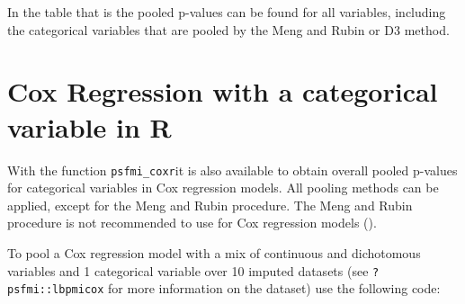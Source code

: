 \documentclass[
]{book}
\newenvironment{Shaded}{\begin{snugshade}}{\end{snugshade}}
\newcommand{\DataTypeTok}[1]{\textcolor[rgb]{0.13,0.29,0.53}{#1}}
\newcommand{\DecValTok}[1]{\textcolor[rgb]{0.00,0.00,0.81}{#1}}
\newcommand{\KeywordTok}[1]{\textcolor[rgb]{0.13,0.29,0.53}{\textbf{#1}}}
\newcommand{\NormalTok}[1]{#1}
\newcommand{\OperatorTok}[1]{\textcolor[rgb]{0.81,0.36,0.00}{\textbf{#1}}}
\newcommand{\StringTok}[1]{\textcolor[rgb]{0.31,0.60,0.02}{#1}}
\begin{document}
In the table that is the pooled p-values can be found for all variables, including the categorical variables that are pooled by the Meng and Rubin or D3 method.

\hypertarget{cox-regression-with-a-categorical-variable-in-r}{%
\section{Cox Regression with a categorical variable in R}\label{cox-regression-with-a-categorical-variable-in-r}}

With the function \texttt{psfmi\_coxr}it is also available to obtain overall pooled p-values for categorical variables in Cox regression models. All pooling methods can be applied, except for the Meng and Rubin procedure. The Meng and Rubin procedure is not recommended to use for Cox regression models (\citet{Marshall2009MedResMeth}).

To pool a Cox regression model with a mix of continuous and dichotomous variables and 1 categorical variable over 10 imputed datasets (see \texttt{?psfmi::lbpmicox} for more information on the dataset) use the following code:

\begin{Shaded}
\end{Shaded}
\end{document}
